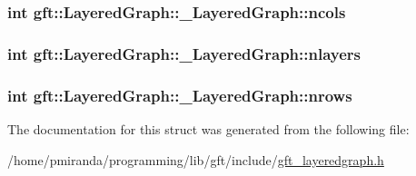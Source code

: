 \subsubsection[{\texorpdfstring{ncols}{ncols}}]{\setlength{\rightskip}{0pt plus 5cm}int gft\+::\+Layered\+Graph\+::\+\_\+\+Layered\+Graph\+::ncols}\hypertarget{structgft_1_1LayeredGraph_1_1__LayeredGraph_a5eeae6a98de252cadbb5837e6d214bc9}{}\label{structgft_1_1LayeredGraph_1_1__LayeredGraph_a5eeae6a98de252cadbb5837e6d214bc9}
\subsubsection[{\texorpdfstring{nlayers}{nlayers}}]{\setlength{\rightskip}{0pt plus 5cm}int gft\+::\+Layered\+Graph\+::\+\_\+\+Layered\+Graph\+::nlayers}\hypertarget{structgft_1_1LayeredGraph_1_1__LayeredGraph_a4d939ee4001d3f04c6aa7b3b50497983}{}\label{structgft_1_1LayeredGraph_1_1__LayeredGraph_a4d939ee4001d3f04c6aa7b3b50497983}
\subsubsection[{\texorpdfstring{nrows}{nrows}}]{\setlength{\rightskip}{0pt plus 5cm}int gft\+::\+Layered\+Graph\+::\+\_\+\+Layered\+Graph\+::nrows}\hypertarget{structgft_1_1LayeredGraph_1_1__LayeredGraph_a27cf4d0997e25e7a8602016b663091c2}{}\label{structgft_1_1LayeredGraph_1_1__LayeredGraph_a27cf4d0997e25e7a8602016b663091c2}


The documentation for this struct was generated from the following file\+:\begin{DoxyCompactItemize}
\item 
/home/pmiranda/programming/lib/gft/include/\hyperlink{gft__layeredgraph_8h}{gft\+\_\+layeredgraph.\+h}\end{DoxyCompactItemize}
